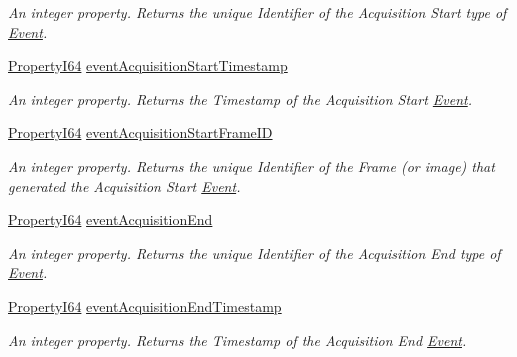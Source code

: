 \begin{DoxyCompactItemize}
\begin{DoxyCompactList}\small\item\em An integer property. Returns the unique Identifier of the Acquisition Start type of \hyperlink{classmv_i_m_p_a_c_t_1_1acquire_1_1_event}{Event}. \end{DoxyCompactList}\item 
\hyperlink{group___common_interface_ga81749b2696755513663492664a18a893}{Property\+I64} \hyperlink{classmv_i_m_p_a_c_t_1_1acquire_1_1_gen_i_cam_1_1_event_control_a2045f7e08a8bc22b05ff5d4e1f76e627}{event\+Acquisition\+Start\+Timestamp}
\begin{DoxyCompactList}\small\item\em An integer property. Returns the Timestamp of the Acquisition Start \hyperlink{classmv_i_m_p_a_c_t_1_1acquire_1_1_event}{Event}. \end{DoxyCompactList}\item 
\hyperlink{group___common_interface_ga81749b2696755513663492664a18a893}{Property\+I64} \hyperlink{classmv_i_m_p_a_c_t_1_1acquire_1_1_gen_i_cam_1_1_event_control_a0ab9b11121db973bfbc01216025d3db9}{event\+Acquisition\+Start\+Frame\+I\+D}
\begin{DoxyCompactList}\small\item\em An integer property. Returns the unique Identifier of the Frame (or image) that generated the Acquisition Start \hyperlink{classmv_i_m_p_a_c_t_1_1acquire_1_1_event}{Event}. \end{DoxyCompactList}\item 
\hyperlink{group___common_interface_ga81749b2696755513663492664a18a893}{Property\+I64} \hyperlink{classmv_i_m_p_a_c_t_1_1acquire_1_1_gen_i_cam_1_1_event_control_aa330f7b63dd632690618b43a5ff4e30b}{event\+Acquisition\+End}
\begin{DoxyCompactList}\small\item\em An integer property. Returns the unique Identifier of the Acquisition End type of \hyperlink{classmv_i_m_p_a_c_t_1_1acquire_1_1_event}{Event}. \end{DoxyCompactList}\item 
\hyperlink{group___common_interface_ga81749b2696755513663492664a18a893}{Property\+I64} \hyperlink{classmv_i_m_p_a_c_t_1_1acquire_1_1_gen_i_cam_1_1_event_control_a52cf773458231c8d11751f3460d722ab}{event\+Acquisition\+End\+Timestamp}
\begin{DoxyCompactList}\small\item\em An integer property. Returns the Timestamp of the Acquisition End \hyperlink{classmv_i_m_p_a_c_t_1_1acquire_1_1_event}{Event}. \end{DoxyCompactList}\item 

\end{DoxyCompactItemize}
